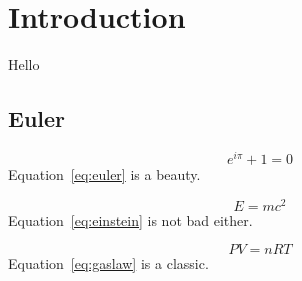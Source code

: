 \documentclass{report}
\begin{document}
\chapter{Introduction}\label{ch:intro}
Hello
\section{Euler}\label{sec:euler}
\begin{equation}\label{eq:euler}
e^{i\pi}+1=0
\end{equation}
Equation~\eqref{eq:euler} is a beauty.

\begin{equation}\label{eq:einstein}
E = mc^2 \tag{*}
\end{equation}
Equation~\eqref{eq:einstein} is not bad either.

\begin{equation}\label{eq:gaslaw}
PV = nRT
\end{equation}
Equation~\eqref{eq:gaslaw} is a classic.
\end{document}

